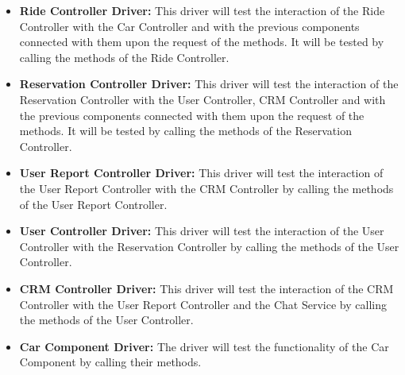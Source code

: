 \documentclass[a4paper]{article}
\begin{document}
\begin{itemize}
\item \textbf{Ride Controller Driver:} This driver will test the interaction of the Ride Controller with the Car Controller and with the previous components connected with them upon the request of the methods. It will be tested by calling the methods of the Ride Controller.

\item \textbf{Reservation Controller Driver:} This driver will test the interaction of the Reservation Controller with the  User Controller, CRM Controller and with the previous components connected with them upon the request of the methods. It will be tested by calling the methods of the  Reservation Controller.

\item \textbf{User Report Controller Driver:} This driver will test the interaction of the User Report Controller with the CRM Controller by calling the methods of the User Report Controller. 

\item \textbf{User Controller Driver:} This driver will test the interaction of the User Controller with the Reservation Controller by calling the methods of the User Controller. 


\item \textbf{CRM Controller Driver: } This driver will test the interaction of the CRM Controller with the User Report Controller and the Chat Service by calling the methods of the User Controller. 

\item \textbf{Car Component Driver: } The driver will test the functionality of the Car Component by calling their methods.
\end{itemize}  

\newpage
\end{document}
